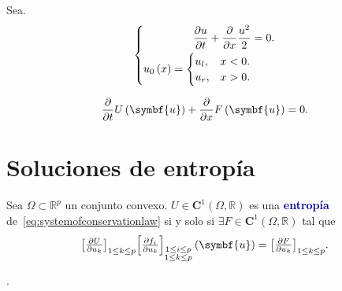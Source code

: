 \begin{example}[]
	Sea.
	\begin{equation*}
		\left\{
		\begin{aligned}
			\diffp{u}{t}+
			\diffp{}{x}
			\frac{u^{2}}{2} & =
			0.                  \\
			u_{0}\left(x\right)=
			\begin{cases}
				u_{l}, & x<0. \\
				u_{r}, & x>0.
			\end{cases}
		\end{aligned}
		\right.
	\end{equation*}
\end{example}

\begin{equation*}
	\diffp{}{t}
	U\left(\symbf{u}\right)+
	\diffp{}{x}
	F\left(\symbf{u}\right)=
	0.
\end{equation*}


\section{Soluciones de entropía}

\begin{definition}
	Sea $\Omega\subset\mathbb{R}^{p}$ un conjunto convexo.
	$U\in\symbf{C}^{1}\left(\Omega,\mathbb{R}\right)$ es una
	\textcolor{DarkBlue}{\bfseries entropía}
	de~\eqref{eq:systemofconservationlaw} si y solo si
	$\exists F\in\symbf{C}^{1}\left(\Omega,\mathbb{R}\right)$ tal que
	\begin{equation*}
		{\begin{bmatrix}
				\diffp{U}{u_{k}}
			\end{bmatrix}}_{1\leq k\leq p}
		{\begin{bmatrix}
				\diffp{f_{i}}{u_{k}}
			\end{bmatrix}}_{\substack{1\leq i\leq p\\1\leq k\leq p}}
		\left(\symbf{u}\right)=
		{\begin{bmatrix}
			\diffp{F}{u_{k}}
		\end{bmatrix}}_{1\leq k\leq p}.
	\end{equation*}
\end{definition}

\begin{example}[$p$-sistema]
	.
\end{example}

